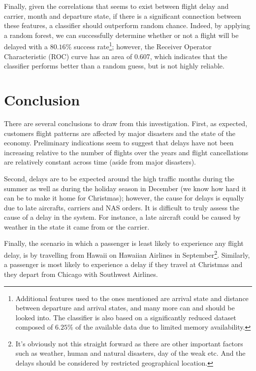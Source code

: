 \documentclass[11pt,twoside,titlepage]{article}
\begin{document}
Finally, given the correlations that seems to exist between flight delay and carrier, month and departure state, if there is a significant connection between these features, a classifier should outperform random chance. Indeed, by applying a random forest, we can successfully determine whether or not a flight will be delayed with a $80.16\%$ success rate\footnote{Additional features used to the ones mentioned are arrival state and distance between departure and arrival states, and many more can and should be looked into. The classifier is also based on a significantly reduced dataset composed of $6.25\%$ of the available data due to limited memory availability.}; however, the Receiver Operator Characteristic (ROC) curve has an area of 0.607, which indicates that the classifier performs better than a random guess, but is not highly reliable.

\section{Conclusion}

There are several conclusions to draw from this investigation. First, as expected, customers flight patterns are affected by major disasters and the state of the economy. Preliminary indications seem to suggest that delays have not been increasing relative to the number of flights over the years and flight cancellations are relatively constant across time (aside from major disasters).

Second, delays are to be expected around the high traffic months during the summer as well as during the holiday season in December (we know how hard it can be to make it home for Christmas); however, the cause for delays is equally due to late aircrafts, carriers and NAS orders. It is difficult to truly assess the cause of a delay in the system. For instance, a late aircraft could be caused by weather in the state it came from or the carrier.

Finally, the scenario in which a passenger is least likely to experience any flight delay, is by travelling from Hawaii on Hawaiian Airlines in September\footnote{It's obviously not this straight forward as there are other important factors such as weather, human and natural disasters, day of the weak etc. And the delays should be considered by restricted geographical location.}. Similarly, a passenger is most likely to experience a delay if they travel at Christmas and they depart from Chicago with Southwest Airlines.
\end{document}
